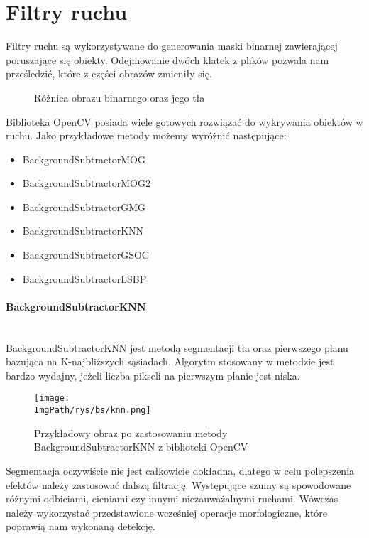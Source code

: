 \documentclass[a4paper,12pt,twoside,openany]{report}
\newcommand{\ImgPath}{.}
\begin{document}
\section{Filtry ruchu}
Filtry ruchu są wykorzystywane do generowania maski binarnej zawierającej poruszające się obiekty. Odejmowanie dwóch klatek z plików pozwala nam prześledzić, które z części obrazów zmieniły się. 

\begin{figure}[H]
	\centering
	\caption{Różnica obrazu binarnego oraz jego tła}
\end{figure}

Biblioteka OpenCV posiada wiele gotowych rozwiązać do wykrywania obiektów w ruchu\cite{opencvs2}. Jako przykładowe metody możemy wyróżnić następujące:
\begin{itemize} 
	\item BackgroundSubtractorMOG
	\item BackgroundSubtractorMOG2
	\item BackgroundSubtractorGMG
	\item BackgroundSubtractorKNN
	\item BackgroundSubtractorGSOC
	\item BackgroundSubtractorLSBP
\end{itemize} 
	
\paragraph{BackgroundSubtractorKNN} \mbox{} \\
 \indent
 BackgroundSubtractorKNN jest metodą segmentacji tła oraz pierwszego planu bazująca na K-najbliższych sąsiadach. Algorytm stosowany w metodzie jest bardzo wydajny, jeżeli liczba pikseli na pierwszym planie jest niska\cite{KNN}. 

\begin{figure}[H]	
	\centering
	\texttt{[image: \\ImgPath/rys/bs/knn.png]}
	
	\caption{Przykładowy obraz po zastosowaniu metody BackgroundSubtractorKNN z biblioteki OpenCV}
\end{figure}
 
 Segmentacja oczywiście nie jest całkowicie dokładna, dlatego w celu polepszenia efektów należy zastosować dalszą filtrację. Występujące szumy są spowodowane różnymi odbiciami, cieniami czy innymi niezauważalnymi ruchami. Wówczas należy wykorzystać przedstawione wcześniej operacje morfologiczne, które poprawią nam wykonaną detekcję.
\end{document}
